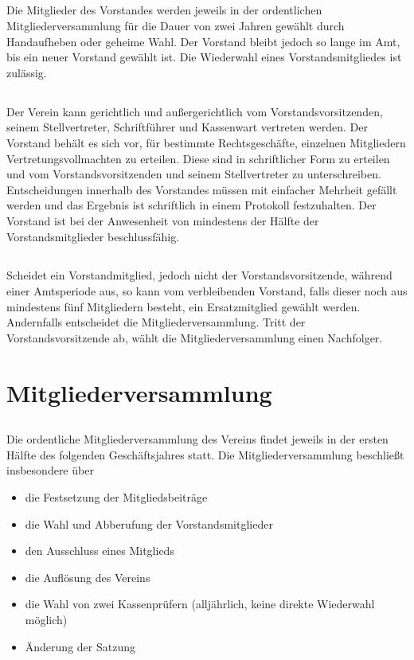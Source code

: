 	\subsection {}  Die Mitglieder des Vorstandes werden jeweils in der ordentlichen Mitgliederversammlung für die Dauer von zwei Jahren gewählt durch Handaufheben oder geheime Wahl. Der Vorstand bleibt jedoch so lange im Amt, bis ein neuer Vorstand gewählt ist. Die Wiederwahl eines Vorstandsmitgliedes ist zulässig.
	
	\subsection {} Der Verein kann gerichtlich und außergerichtlich vom Vorstandsvorsitzenden, seinem Stellvertreter, Schriftführer und Kassenwart vertreten werden. Der Vorstand behält es sich vor, für bestimmte Rechtsgeschäfte, einzelnen Mitgliedern Vertretungsvollmachten zu erteilen. Diese sind in schriftlicher Form zu erteilen und vom Vorstandsvorsitzenden und seinem Stellvertreter zu unterschreiben.
	Entscheidungen innerhalb des Vorstandes müssen mit einfacher Mehrheit gefällt werden und das Ergebnis ist schriftlich in einem Protokoll festzuhalten. Der Vorstand ist bei der Anwesenheit von mindestens der Hälfte der Vorstandsmitglieder beschlussfähig.
	
	\subsection {} Scheidet ein Vorstandmitglied, jedoch nicht der Vorstandsvorsitzende, während einer Amtsperiode aus, so kann vom verbleibenden Vorstand, falls dieser noch aus mindestens fünf Mitgliedern besteht, ein Ersatzmitglied gewählt werden. Andernfalls entscheidet die Mitgliederversammlung. Tritt der Vorstandsvorsitzende ab, wählt die Mitgliederversammlung einen Nachfolger.

\section{Mitgliederversammlung}
	\subsection{} Die ordentliche Mitgliederversammlung des Vereins findet jeweils in der ersten Hälfte des folgenden Geschäftsjahres statt. Die Mitgliederversammlung beschließt insbesondere über
	
	\begin{itemize}
		\item die Festsetzung der Mitgliedsbeiträge
		\item die Wahl und Abberufung der Vorstandsmitglieder
		\item den Ausschluss eines Mitglieds
		\item die Auflösung des Vereins
		\item die Wahl von zwei Kassenprüfern (alljährlich, keine direkte Wiederwahl möglich)
		\item Änderung der Satzung
	\end{itemize} 

